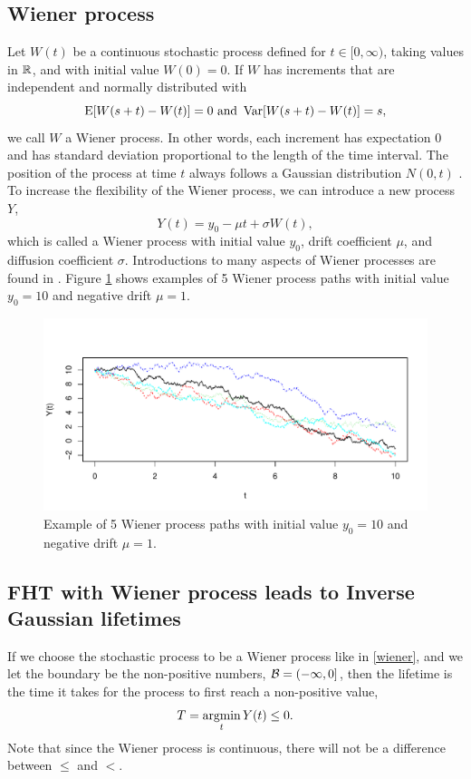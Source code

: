 \subsection{Wiener process}
Let $W(t)$ be a continuous stochastic process defined for $t\in[0,\infty)$, taking values in $\mathbb{R}$, and with initial value $W(0)=0$. If $W$ has increments that are independent and normally distributed with
\begin{equation*}
    \operatorname{E}[W(s+t)-W(t)]=0\text{   and   }\operatorname{Var}[W(s+t)-W(t)]=s,
\end{equation*}
we call $W$ a Wiener process. In other words, each increment has expectation 0 and has standard deviation proportional to the length of the time interval. The position of the process at time $t$ always follows a Gaussian distribution $N(0, t)$ \citep{ABG}. To increase the flexibility of the Wiener process, we can introduce a new process $Y$,
\begin{equation}\label{wiener}
    Y(t)=y_0-\mu t+\sigma W(t),
\end{equation}
which is called a Wiener process with initial value $y_0$, drift coefficient $\mu$, and diffusion coefficient $\sigma$. Introductions to many aspects of Wiener processes are found in \citet{cox1965}. Figure \ref{plot:wiener} shows examples of 5 Wiener process paths with initial value $y_0=10$ and negative drift $\mu=1$.
\begin{figure}[H]
\label{plot:wiener}
\caption{Example of 5 Wiener process paths with initial value $y_0=10$ and negative drift $\mu=1$.}
\centering
\includegraphics[scale=0.4]{figures/wiener_processes.pdf}
\end{figure}

\subsection{FHT with Wiener process leads to Inverse Gaussian lifetimes}
If we choose the stochastic process to be a Wiener process like in \eqref{wiener}, and we let the boundary be the non-positive numbers, $\mathcal{B}=(-\infty,0]$, then the lifetime is the time it takes for the process to first reach a non-positive value,
\begin{equation}
    T=\operatorname*{argmin}_{t}Y(t)\leq0.
\end{equation}
Note that since the Wiener process is continuous, there will not be a difference between $\leq$ and $<$.

